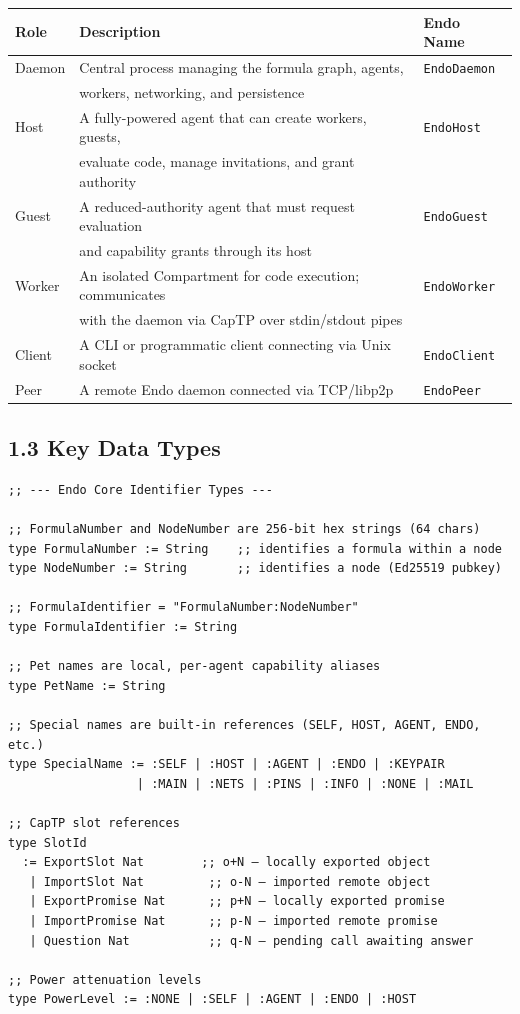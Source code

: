 \documentclass[11pt]{article}
\begin{document}
\begin{center}
\begin{tabular}{lll}
Role & Description & Endo Name\\
\hline
Daemon & Central process managing the formula graph, agents, & \texttt{EndoDaemon}\\
 & workers, networking, and persistence & \\
Host & A fully-powered agent that can create workers, guests, & \texttt{EndoHost}\\
 & evaluate code, manage invitations, and grant authority & \\
Guest & A reduced-authority agent that must request evaluation & \texttt{EndoGuest}\\
 & and capability grants through its host & \\
Worker & An isolated Compartment for code execution; communicates & \texttt{EndoWorker}\\
 & with the daemon via CapTP over stdin/stdout pipes & \\
Client & A CLI or programmatic client connecting via Unix socket & \texttt{EndoClient}\\
Peer & A remote Endo daemon connected via TCP/libp2p & \texttt{EndoPeer}\\
\end{tabular}
\end{center}
\subsection{1.3 Key Data Types}
\label{sec:org7b28e91}

\begin{verbatim}
;; --- Endo Core Identifier Types ---

;; FormulaNumber and NodeNumber are 256-bit hex strings (64 chars)
type FormulaNumber := String    ;; identifies a formula within a node
type NodeNumber := String       ;; identifies a node (Ed25519 pubkey)

;; FormulaIdentifier = "FormulaNumber:NodeNumber"
type FormulaIdentifier := String

;; Pet names are local, per-agent capability aliases
type PetName := String

;; Special names are built-in references (SELF, HOST, AGENT, ENDO, etc.)
type SpecialName := :SELF | :HOST | :AGENT | :ENDO | :KEYPAIR
                  | :MAIN | :NETS | :PINS | :INFO | :NONE | :MAIL

;; CapTP slot references
type SlotId
  := ExportSlot Nat        ;; o+N — locally exported object
   | ImportSlot Nat         ;; o-N — imported remote object
   | ExportPromise Nat      ;; p+N — locally exported promise
   | ImportPromise Nat      ;; p-N — imported remote promise
   | Question Nat           ;; q-N — pending call awaiting answer

;; Power attenuation levels
type PowerLevel := :NONE | :SELF | :AGENT | :ENDO | :HOST
\end{verbatim}
\end{document}
